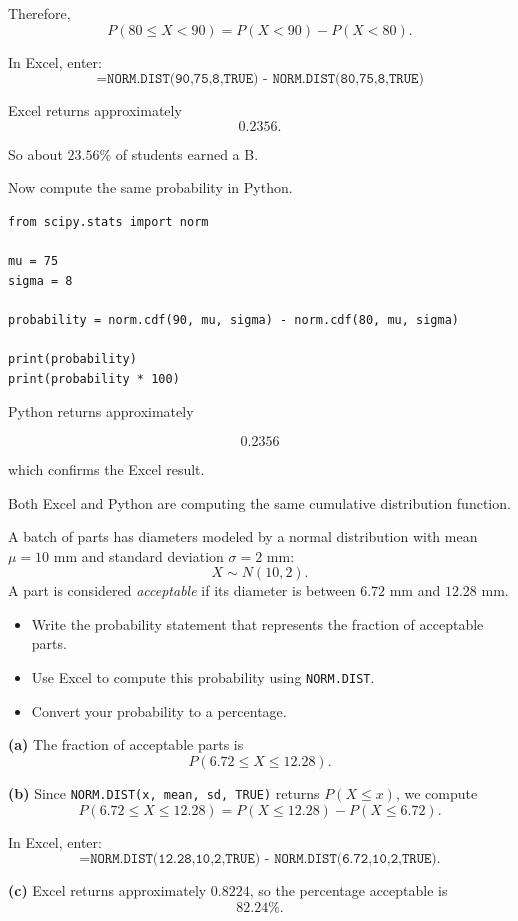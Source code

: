 Therefore,
\[
P(80 \le X < 90)
=
P(X < 90) - P(X < 80).
\]

In Excel, enter:
\[
\texttt{=NORM.DIST(90,75,8,TRUE) - NORM.DIST(80,75,8,TRUE)}
\]

Excel returns approximately
\[
0.2356.
\]

So about $23.56\%$ of students earned a B.

Now compute the same probability in Python.

\begin{verbatim}
from scipy.stats import norm

mu = 75
sigma = 8

probability = norm.cdf(90, mu, sigma) - norm.cdf(80, mu, sigma)

print(probability)
print(probability * 100)
\end{verbatim}

Python returns approximately

\[
0.2356
\]

which confirms the Excel result.

Both Excel and Python are computing the same cumulative distribution function.

\begin{Exercise}[label = normalt1]

A batch of parts has diameters modeled by a normal distribution with mean
$\mu = 10$ mm and standard deviation $\sigma = 2$ mm:
\[
X \sim N(10,2).
\]
A part is considered \emph{acceptable} if its diameter is between $6.72$ mm and
$12.28$ mm.

\begin{itemize}
    \item[(a)] Write the probability statement that represents the fraction of acceptable parts.
    \item[(b)] Use Excel to compute this probability using \texttt{NORM.DIST}.
    \item[(c)] Convert your probability to a percentage.
\end{itemize}

\vspace{100mm}

\end{Exercise}

\begin{Answer}[ref = normalt1]

\textbf{(a)} The fraction of acceptable parts is
\[
P(6.72 \le X \le 12.28).
\]

\textbf{(b)} Since \texttt{NORM.DIST(x, mean, sd, TRUE)} returns $P(X \le x)$,
we compute
\[
P(6.72 \le X \le 12.28)=P(X \le 12.28)-P(X \le 6.72).
\]

In Excel, enter:
\[
\texttt{=NORM.DIST(12.28,10,2,TRUE) - NORM.DIST(6.72,10,2,TRUE)}.
\]

\textbf{(c)} Excel returns approximately $0.8224$, so the percentage acceptable is
\[
82.24\%.
\]

\end{Answer}
